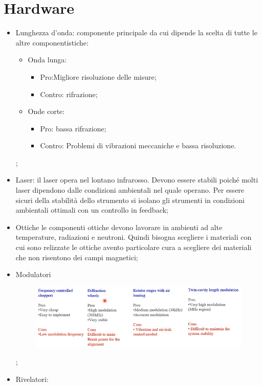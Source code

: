 \documentclass{article}
\begin{document}
 \section{Hardware}
\begin{itemize}
    \item Lunghezza d'onda: componente principale da cui dipende la scelta di tutte le altre componentistiche:\begin{itemize}
        \item Onda lunga:\begin{itemize}
            \item Pro:Migliore risoluzione delle misure;
            \item Contro: rifrazione;
        \end{itemize}
        \item Onde corte:\begin{itemize}
            \item Pro: bassa rifrazione;
            \item Contro: Problemi di vibrazioni meccaniche e bassa risoluzione.
        \end{itemize}
    \end{itemize};
    \item Laser: il laser opera nel lontano infrarosso. Devono essere stabili poiché molti laser dipendono dalle condizioni ambientali nel quale operano. Per essere sicuri della stabilità dello strumento si isolano gli strumenti in condizioni ambientali ottimali con un controllo in feedback;
    \item Ottiche le componenti ottiche devono lavorare in ambienti ad alte temperature, radiazioni e neutroni. Quindi bisogna scegliere i materiali con cui sono relizzate le ottiche avento particolare cura a scegliere dei materiali che non risentono dei campi magnetici;
    \item Modulatori\begin{figure}
        \includegraphics[scale=0.4]{2022-05-29-16-41-03.png}%
    \end{figure};
    \item Rivelatori:\begin{figure}

\end{figure}
\end{itemize}
\end{document}

